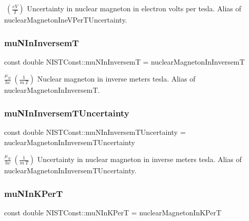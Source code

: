 $ \ (\frac{eV}{T})$ Uncertainty in nuclear magneton in electron volts per tesla. Alias of nuclear\+Magneton\+Ine\+V\+Per\+T\+Uncertainty. \mbox{\label{group___n_i_s_t_const-_nuclear_magneton_ga9c4499c279614bf4bb837c9c4c74b208}} 
\subsubsection{\texorpdfstring{mu\+N\+In\+InversemT}{muNInInversemT}}
{\footnotesize\ttfamily const double N\+I\+S\+T\+Const\+::mu\+N\+In\+InversemT = nuclear\+Magneton\+In\+InversemT}

$\frac{\mu_N}{hc} \ (\frac{1}{m\ T})$ Nuclear magneton in inverse meters tesla. Alias of nuclear\+Magneton\+In\+InversemT. \mbox{\label{group___n_i_s_t_const-_nuclear_magneton_ga863b9f210eb86d33267fcb9b38b24082}} 
\subsubsection{\texorpdfstring{mu\+N\+In\+Inversem\+T\+Uncertainty}{muNInInversemTUncertainty}}
{\footnotesize\ttfamily const double N\+I\+S\+T\+Const\+::mu\+N\+In\+Inversem\+T\+Uncertainty = nuclear\+Magneton\+In\+Inversem\+T\+Uncertainty}

$\frac{\mu_N}{hc} \ (\frac{1}{m\ T})$ Uncertainty in nuclear magneton in inverse meters tesla. Alias of nuclear\+Magneton\+In\+Inversem\+T\+Uncertainty. \mbox{\label{group___n_i_s_t_const-_nuclear_magneton_gaca6a801a34347be9fd04e7882187484c}} 
\subsubsection{\texorpdfstring{mu\+N\+In\+K\+PerT}{muNInKPerT}}
{\footnotesize\ttfamily const double N\+I\+S\+T\+Const\+::mu\+N\+In\+K\+PerT = nuclear\+Magneton\+In\+K\+PerT}

